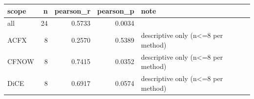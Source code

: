 \begin{tabular}{lrrrl}
\toprule
scope &  n &  pearson\_r &  pearson\_p &                               note \\
\midrule
  all & 24 &     0.5733 &     0.0034 &                                    \\
 ACFX &  8 &     0.2570 &     0.5389 & descriptive only (n<=8 per method) \\
CFNOW &  8 &     0.7415 &     0.0352 & descriptive only (n<=8 per method) \\
 DiCE &  8 &     0.6917 &     0.0574 & descriptive only (n<=8 per method) \\
\bottomrule
\end{tabular}
